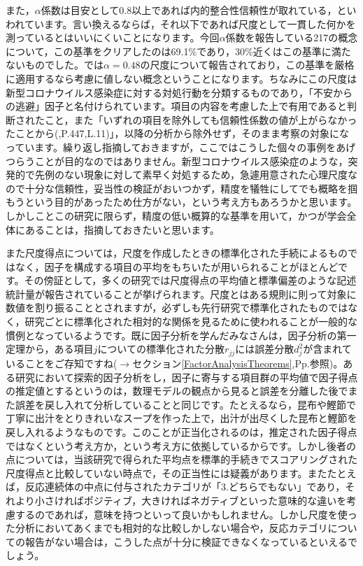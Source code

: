 \documentclass{ltjsbook}
\begin{document}
また，$\alpha$係数は目安として0.8以上であれば内的整合性信頼性が取れている，といわれています。言い換えるならば，それ以下であれば尺度として一貫した何かを測っているとはいいにくいことになります。今回$\alpha$係数を報告している217の概念について，この基準をクリアしたのは69.1\%であり，30\%近くはこの基準に満たないものでした。\textcite{Koiwa202192}では$\alpha=0.48$の尺度について報告されており，この基準を厳格に適用するなら考慮に値しない概念ということになります。ちなみにこの尺度は新型コロナウイルス感染症に対する対処行動を分類するものであり，「不安からの逃避」因子と名付けられています。項目の内容を考慮した上で有用であると判断されたこと，また「いずれの項目を除外しても信頼性係数の値が上がらなかったことから(\parencite{Koiwa202192},P.447,L.11)」，以降の分析から除外せず，そのまま考察の対象になっています。繰り返し指摘しておきますが，ここではこうした個々の事例をあげつらうことが目的なのではありません。新型コロナウイルス感染症のような，突発的で先例のない現象に対して素早く対処するため，急遽用意された心理尺度なので十分な信頼性，妥当性の検証がおいつかず，精度を犠牲にしてでも概略を掴もうという目的があったため仕方がない，という考え方もあろうかと思います。しかしことこの研究に限らず，精度の低い概算的な基準を用いて，かつが学会全体にあることは，指摘しておきたいと思います。

また尺度得点については，尺度を作成したときの標準化された手続によるものではなく，因子を構成する項目の平均をもちいたが用いられることがほとんどです。その傍証として，多くの研究では尺度得点の平均値と標準偏差のような記述統計量が報告されていることが挙げられます。尺度とはある規則に則って対象に数値を割り振ることとされますが，必ずしも先行研究で標準化されたものではなく，研究ごとに標準化された相対的な関係を見るために使われることが一般的な慣例となっているようです。既に因子分析を学んだみなさんは，因子分析の第一定理から，ある項目$j$についての標準化された分散$r_{jj}$には誤差分散$d_j^2$が含まれていることをご存知ですね($\to$セクション\ref{FactorAnalysisTheorems},Pp.\pageref{FactorAnalysisTheorems}参照)。ある研究において探索的因子分析をし，因子に寄与する項目群の平均値で因子得点の推定値とするというのは，数理モデルの観点から見ると誤差を分離した後でまた誤差を戻し入れて分析していることと同じです。たとえるなら，昆布や鰹節で丁寧に出汁をとりきれいなスープを作った上で，出汁が出尽くした昆布と鰹節を戻し入れるようなものです。このことが正当化されるのは，推定された因子得点ではなくという考え方か，という考え方に依拠しているからです。しかし後者の点については，当該研究で得られた平均点を標準的手続きでスコアリングされた尺度得点と比較していない時点で，その正当性には疑義があります。またたとえば，反応連続体の中点に付与されたカテゴリが「3.どちらでもない」であり，それより小さければポジティブ，大きければネガティブといった意味的な違いを考慮するのであれば，意味を持つといって良いかもしれません。しかし尺度を使った分析においてあくまでも相対的な比較しかしない場合や，反応カテゴリについての報告がない場合は，こうした点が十分に検証できなくなっているといえるでしょう。
\end{document}
